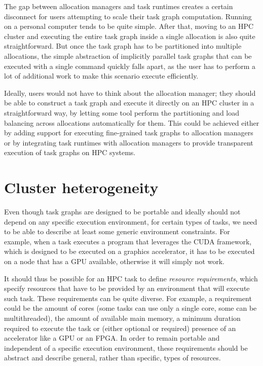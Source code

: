 \vspace{5mm}
The gap between allocation managers and task runtimes creates a certain disconnect for users
attempting to scale their task graph computation. Running on a personal computer tends to be quite
simple. After that, moving to an HPC cluster and executing the entire task graph inside a single
allocation is also quite straightforward. But once the task graph has to be partitioned into
multiple allocations, the simple abstraction of implicitly parallel task graphs that can be
executed with a single command quickly falls apart, as the user has to perform a lot of additional
work to make this scenario execute efficiently.

Ideally, users would not have to think about the allocation manager; they should be able to
construct a task graph and execute it directly on an HPC cluster in a straightforward way, by
letting some tool perform the partitioning and load balancing across allocations automatically for
them. This could be achieved either by adding support for executing fine-grained task graphs to
allocation managers or by integrating task runtimes with allocation managers to provide transparent
execution of task graphs on HPC systems.

\section{Cluster heterogeneity}
Even though task graphs are designed to be portable and ideally should not depend on any specific
execution environment, for certain types of tasks, we need to be able to describe at least some
generic environment constraints. For example, when a task executes a program that leverages the
CUDA framework, which is designed to be executed on a graphics
accelerator, it has to be executed on a node that has a GPU available, otherwise it will simply not
work.

It should thus be possible for an HPC task to define \emph{resource requirements}, which specify
resources that have to be provided by an environment that will execute such task. These
requirements can be quite diverse. For example, a requirement could be the amount of cores (some
tasks can use only a single core, some can be multithreaded), the amount of available main memory,
a minimum duration required to execute the task or (either optional or required) presence of an
accelerator like a GPU or an FPGA\@. In order to remain portable and independent of a specific
execution environment, these requirements should be abstract and describe general, rather than
specific, types of resources.

